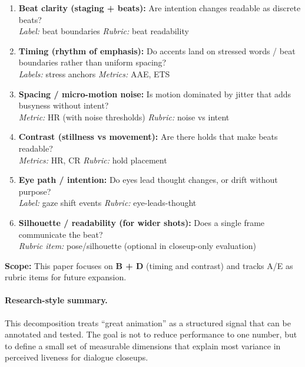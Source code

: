 \documentclass[11pt,a4paper]{article}
\begin{document}
\begin{enumerate}[label=\textbf{\Alph*}), leftmargin=2em]
    \item \textbf{Beat clarity (staging + beats):} Are intention changes readable as discrete beats? \\
    \textit{Label:} beat boundaries \quad \textit{Rubric:} beat readability
    
    \item \textbf{Timing (rhythm of emphasis):} Do accents land on stressed words / beat boundaries rather than uniform spacing? \\
    \textit{Labels:} stress anchors \quad \textit{Metrics:} AAE, ETS
    
    \item \textbf{Spacing / micro-motion noise:} Is motion dominated by jitter that adds busyness without intent? \\
    \textit{Metric:} HR (with noise thresholds) \quad \textit{Rubric:} noise vs intent
    
    \item \textbf{Contrast (stillness vs movement):} Are there holds that make beats readable? \\
    \textit{Metrics:} HR, CR \quad \textit{Rubric:} hold placement
    
    \item \textbf{Eye path / intention:} Do eyes lead thought changes, or drift without purpose? \\
    \textit{Label:} gaze shift events \quad \textit{Rubric:} eye-leads-thought
    
    \item \textbf{Silhouette / readability (for wider shots):} Does a single frame communicate the beat? \\
    \textit{Rubric item:} pose/silhouette (optional in closeup-only evaluation)
\end{enumerate}

\noindent\textbf{Scope:} This paper focuses on \textbf{B + D} (timing and contrast) and tracks A/E as rubric items for future expansion.

\paragraph{Research-style summary.} This decomposition treats ``great animation'' as a structured signal that can be annotated and tested. The goal is not to reduce performance to one number, but to define a small set of measurable dimensions that explain most variance in perceived liveness for dialogue closeups.
\end{document}
